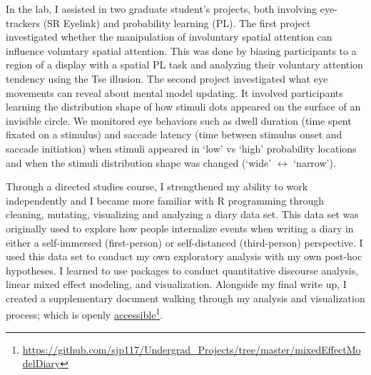 \documentclass[12pt]{article}
\begin{document}
In the lab, I assisted in two graduate student's projects, both involving eye-trackers (SR Eyelink) and probability learning (PL). The first project investigated whether the manipulation of involuntary spatial attention can influence voluntary spatial attention. This was done by biasing participants to a region of a display with a spatial PL task and analyzing their voluntary attention tendency using the Tse illusion. The second project investigated what eye movements can reveal about mental model updating. It involved participants learning the distribution shape of how stimuli dots appeared on the surface of an invisible circle. We monitored eye behaviors such as dwell duration (time spent fixated on a stimulus) and saccade latency (time between stimulus onset and saccade initiation) when stimuli appeared in `low' vs `high' probability locations and when the stimuli distribution shape was changed (`wide' $\leftrightarrow$ `narrow').

Through a directed studies course, I strengthened my ability to work independently and I became more familiar with R programming through cleaning, mutating, visualizing and analyzing a diary data set. This data set was originally used to explore how people internalize events when writing a diary in either a self-immersed (first-person) or self-distanced (third-person) perspective. I used this data set to conduct my own exploratory analysis with my own post-hoc hypotheses. I learned to use packages to conduct quantitative discourse analysis, linear mixed effect modeling, and visualization. Alongside my final write up, I created a supplementary document walking through my analysis and visualization process; which is openly  \href{https://github.com/sjp117/Undergrad_Projects/tree/master/mixedEffectModelDiary}{accessible}\footnote{\url{https://github.com/sjp117/Undergrad\_Projects/tree/master/mixedEffectModelDiary}}.
\end{document}
